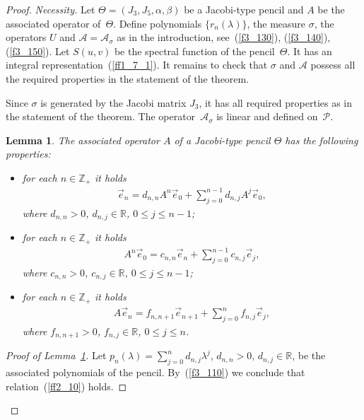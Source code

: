 \documentclass[11pt]{article}
\numberwithin{equation}{section}
\newtheorem{Lemma}[Theorem]{Lemma}
 { \theoremstyle{definition}
\newtheorem{Definition}[Theorem]{Definition}
\newtheorem{Example}[Theorem]{Example} }
\begin{document}
\begin{proof} \textit{Necessity.} Let $\Theta = ( J_3, J_5, \alpha, \beta )$ be a Jacobi-type pencil and $A$ be the associated operator of~$\Theta$. Def\/ine polynomials $\{ r_n(\lambda) \}$, the measure $\sigma$, the operators $U$ and $\mathcal{A}=\mathcal{A}_\sigma$ as in the introduction, see~(\ref{f3_130}), (\ref{f3_140}), (\ref{f3_150}). Let $S(u,v)$ be the spectral function of the pencil~$\Theta$. It has an integral representation~(\ref{ff1_7_1}). It remains to check that $\sigma$ and $\mathcal{A}$ possess all the required properties in the statement of the theorem.

Since $\sigma$ is generated by the Jacobi matrix $J_3$, it has all required properties as in the statement of the theorem. The operator~$\mathcal{A}_\sigma$ is linear and def\/ined on~$\mathcal{P}$.

\begin{Lemma}\label{ll2_1} The associated operator $A$ of a Jacobi-type pencil $\Theta$ has the following properties:
\begin{itemize}\itemsep=0pt
\item[$1)$] for each $n\in\mathbb{Z}_+$ it holds
\begin{gather} \label{ff2_10}
\vec e_n = d_{n,n} A^n \vec e_0 + \sum_{j=0}^{n-1} d_{n,j} A^j \vec e_0,
\end{gather}
where $d_{n,n} > 0$, $d_{n,j}\in\mathbb{R}$, $0\leq j\leq n-1$;

\item[$2)$] for each $n\in\mathbb{Z}_+$ it holds
\begin{gather}\label{ff2_12}
A^n \vec e_0 = c_{n,n} \vec e_n + \sum_{j=0}^{n-1} c_{n,j} \vec e_j,
\end{gather}
where $c_{n,n} > 0$, $c_{n,j}\in\mathbb{R}$, $0\leq j\leq n-1$;

\item[$3)$] for each $n\in\mathbb{Z}_+$ it holds
\begin{gather}\label{ff2_14}
A \vec e_n = f_{n,n+1} \vec e_{n+1} + \sum_{j=0}^{n} f_{n,j} \vec e_j,
\end{gather}
where $f_{n,n+1} > 0$, $f_{n,j}\in\mathbb{R}$, $0\leq j\leq n$.
\end{itemize}
\end{Lemma}

\begin{proof}[Proof of Lemma~\ref{ll2_1}] Let $p_n(\lambda) = \sum\limits_{j=0}^n d_{n,j} \lambda^j$, $d_{n,n}>0$, $d_{n,j}\in\mathbb{R}$, be the associated polyno\-mials of the pencil. By~(\ref{f3_110}) we conclude that relation~(\ref{ff2_10}) holds.


\end{proof}
\end{proof}
\end{document}
